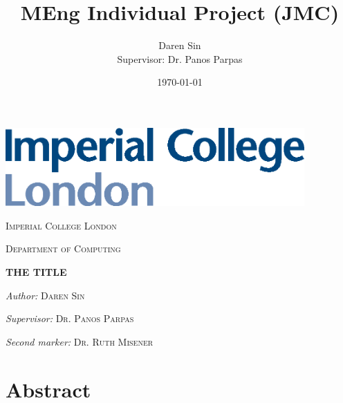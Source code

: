 \documentclass[12pt, twoside, a4paper]{report}
\title{MEng Individual Project (JMC)}
\author{Daren Sin \\  Supervisor: Dr. Panos Parpas}
\date{\today}
\newcommand\blankpage{%
    \null
    \thispagestyle{empty}%
    \addtocounter{page}{-1}%
    \newpage}
\begin{document}
\begin{titlingpage}

\vspace*{2cm}

\begin{center}
\includegraphics[height=3cm]{images/imperial}
\end{center}

\vspace{2cm}
\begin{center}
\Large \textsc{Imperial College London}

\textsc{Department of Computing}
\end{center}

\vspace{2cm}

\begin{center}
\Large \textsc{\thetitle}

\textbf{THE TITLE}
\end{center}

\vspace{2cm}

\begin{center}
\large \textit{Author:} \textsc{Daren Sin}

\textit{Supervisor:} \textsc{Dr. Panos Parpas}

\textit{Second marker:} \textsc{Dr. Ruth Misener}
\end{center}

\vspace{2cm}

\begin{center}
\normalsize \textsc{\thedate}
\end{center}

\end{titlingpage}


\afterpage{\blankpage}

\onehalfspacing
\chapter*{Abstract}

\afterpage{\blankpage}
\end{document}
